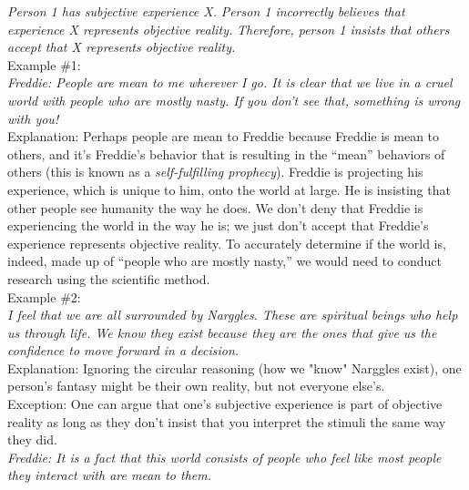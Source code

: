 \documentclass[a4paper,12pt,single,pdftex]{scrartcl}
\begin{document}
    
      {\em Person 1 has subjective experience X.} \newline
{\em Person 1 incorrectly believes that experience X represents objective reality.} \newline
{\em Therefore, person 1 insists that others accept that X represents objective reality.}
    \\

    
      Example \#1:
    \\

    
      {\em Freddie: People are mean to me wherever I go. It is clear that we live in a cruel world with people who are mostly nasty. If you don’t see that, something is wrong with you!}
    \\

    
      Explanation: Perhaps people are mean to Freddie because Freddie is mean to others, and it’s Freddie’s behavior that is resulting in the “mean” behaviors of others (this is known as a {\em self-fulfilling prophecy}). Freddie is projecting his experience, which is unique to him, onto the world at large. He is insisting that other people see humanity the way he does. We don’t deny that Freddie is experiencing the world in the way he is; we just don’t accept that Freddie’s experience represents objective reality. To accurately determine if the world is, indeed, made up of “people who are mostly nasty,” we would need to conduct research using the scientific method.
    \\

    
      Example \#2:
    \\

    
      {\em I feel that we are all surrounded by Narggles. These are spiritual beings who help us through life. We know they exist because they are the ones that give us the confidence to move forward in a decision.}
    \\

    
      Explanation: Ignoring the circular reasoning (how we "know" Narggles exist), one person's fantasy might be their own reality, but not everyone else's.
    \\

    
      Exception: One can argue that one's subjective experience is part of objective reality as long as they don’t insist that you interpret the stimuli the same way they did.
    \\

    
      {\em Freddie: It is a fact that this world consists of people who feel like most people they interact with are mean to them.}
    \\
\end{document}
